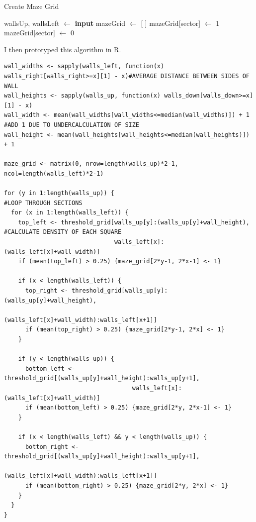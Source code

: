 \documentclass[titlepage]{article}
\begin{document}
\begin{algorithm}[H]
\caption{Create Maze Grid}
\begin{algorithmic}[1]
    	\State wallsUp, wallsLeft $\gets$ \textbf{input}
    	\State mazeGrid $\gets$ [ ]
					\State mazeGrid[sector] $\gets$ 1
	            	 	\Else
					\State mazeGrid[sector] $\gets$ 0
				\EndIf
			\EndFor
		\EndFor
	\EndFor
\end{algorithmic}
\end{algorithm}

I then prototyped this algorithm in R. 

\begin{changemargin}{-1in}{-1in} 
\begin{verbatim}
wall_widths <- sapply(walls_left, function(x) walls_right[walls_right>=x][1] - x)#AVERAGE DISTANCE BETWEEN SIDES OF WALL
wall_heights <- sapply(walls_up, function(x) walls_down[walls_down>=x][1] - x)
wall_width <- mean(wall_widths[wall_widths<=median(wall_widths)]) + 1           #ADD 1 DUE TO UNDERCALCULATION OF SIZE
wall_height <- mean(wall_heights[wall_heights<=median(wall_heights)]) + 1

maze_grid <- matrix(0, nrow=length(walls_up)*2-1, ncol=length(walls_left)*2-1)

for (y in 1:length(walls_up)) {                                                 #LOOP THROUGH SECTIONS
  for (x in 1:length(walls_left)) {
    top_left <- threshold_grid[walls_up[y]:(walls_up[y]+wall_height),           #CALCULATE DENSITY OF EACH SQUARE
                               walls_left[x]:(walls_left[x]+wall_width)]
    if (mean(top_left) > 0.25) {maze_grid[2*y-1, 2*x-1] <- 1}

    if (x < length(walls_left)) {
      top_right <- threshold_grid[walls_up[y]:(walls_up[y]+wall_height),
                                 (walls_left[x]+wall_width):walls_left[x+1]]
      if (mean(top_right) > 0.25) {maze_grid[2*y-1, 2*x] <- 1}
    }

    if (y < length(walls_up)) {
      bottom_left <- threshold_grid[(walls_up[y]+wall_height):walls_up[y+1],
                                    walls_left[x]:(walls_left[x]+wall_width)]
      if (mean(bottom_left) > 0.25) {maze_grid[2*y, 2*x-1] <- 1}
    }

    if (x < length(walls_left) && y < length(walls_up)) {
      bottom_right <- threshold_grid[(walls_up[y]+wall_height):walls_up[y+1],
                                     (walls_left[x]+wall_width):walls_left[x+1]]
      if (mean(bottom_right) > 0.25) {maze_grid[2*y, 2*x] <- 1}
    }
  }
}
\end{verbatim}
\end{changemargin} 
\end{document}
